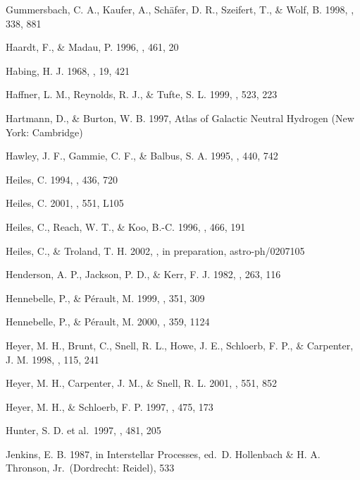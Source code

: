 \documentclass[12pt,preprint,flushrt]{aastex}
\begin{document}
\begin{thebibliography}{}
Gummersbach, C. A., Kaufer, A.,
Sch\"afer, D. R., Szeifert, T., \& Wolf, B. 1998, \aap, 338, 881

Haardt, F., \& Madau, P. 1996, \apj,
461, 20

Habing, H. J. 1968, \bain, 19, 421

Haffner, L. M., Reynolds,
R. J., \& Tufte, S. L.  1999, \apj, 523, 223

Hartmann, D., \& Burton, W. B.
1997, Atlas of Galactic Neutral Hydrogen (New York: Cambridge)

Hawley, J. F., Gammie,
C. F., \& Balbus, S. A. 1995, \apj, 440, 742

Heiles, C. 1994, \apj, 436, 720

Heiles, C. 2001, \apj, 551, L105

 Heiles, C., Reach, W. T.,
\& Koo, B.-C. 1996, \apj, 466, 191

 Heiles, C., \& Troland, T. H.
2002, \apj, in preparation, astro-ph/0207105

Henderson, A. P., Jackson, P. D., \&
Kerr, F. J. 1982, \apj, 263, 116

Hennebelle, P., \& P\'erault,
M. 1999, \aap, 351, 309

Hennebelle, P., \& P\'erault,
M. 2000, \aap, 359, 1124

Heyer, M. H., Brunt, C., Snell, R. L., Howe, J. E., Schloerb, F. P.,
\& Carpenter, J. M. 1998, \apjs, 115, 241

Heyer, M. H., Carpenter, J. M., \& Snell, R. L. 2001, \apj, 551, 852

Heyer, M. H., \& Schloerb, F. P.
1997, \apj, 475, 173

Hunter, S. D. et al.\ 1997, \apj, 481, 205

Jenkins, E. B. 1987, in Interstellar Processes,
ed.\ D. Hollenbach \& H. A. Thronson, Jr.\ (Dordrecht: Reidel), 533


\end{thebibliography}
\end{document}
